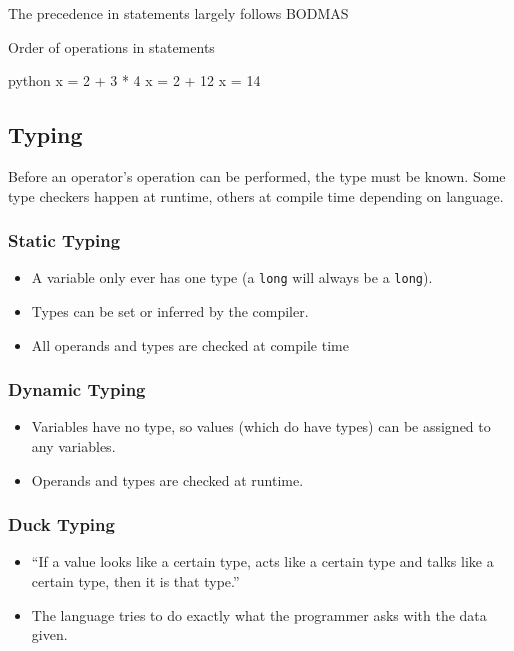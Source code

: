 The precedence in statements largely follows BODMAS

\begin{highlight}{Order of operations in statements}
    \begin{code}{python}
        x = 2 + 3 * 4
        x = 2 + 12
        x = 14
    \end{code}
\end{highlight}

\subsection{Typing}\label{sub:typing}

Before an operator's operation can be performed, the type must be known.
Some type checkers happen at runtime, others at compile time depending on language.

\subsubsection{Static Typing}\label{ssub:static-typing}

\begin{itemize}
    \item A variable only ever has one type (a \texttt{long} will always be a \texttt{long}).
    \item Types can be set or inferred by the compiler.
    \item All operands and types are checked at compile time
\end{itemize}

\subsubsection{Dynamic Typing}\label{ssub:dynamic-typing}

\begin{itemize}
    \item Variables have no type, so values (which do have types) can be assigned to any variables.
    \item Operands and types are checked at runtime.
\end{itemize}

\subsubsection{Duck Typing}\label{ssub:duck-typing}

\begin{itemize}
    \item ``If a value looks like a certain type, acts like a certain type and talks like a certain type, then it is that type.''
    \item The language tries to do exactly what the programmer asks with the data given.
\end{itemize}

